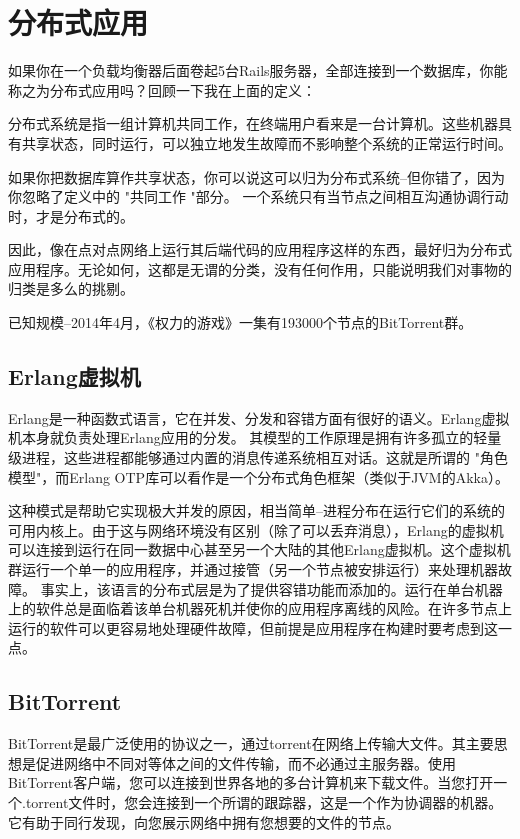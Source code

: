 \documentclass[degree=project,degree-type=project,cjk-font=noto]{thuthesis}
\begin{document}
\chapter{分布式应用}

如果你在一个负载均衡器后面卷起5台Rails服务器，全部连接到一个数据库，你能称之为分布式应用吗？回顾一下我在上面的定义：

分布式系统是指一组计算机共同工作，在终端用户看来是一台计算机。这些机器具有共享状态，同时运行，可以独立地发生故障而不影响整个系统的正常运行时间。

如果你把数据库算作共享状态，你可以说这可以归为分布式系统--但你错了，因为你忽略了定义中的 "共同工作 "部分。
一个系统只有当节点之间相互沟通协调行动时，才是分布式的。

因此，像在点对点网络上运行其后端代码的应用程序这样的东西，最好归为分布式应用程序。无论如何，这都是无谓的分类，没有任何作用，只能说明我们对事物的归类是多么的挑剔。

已知规模--2014年4月，《权力的游戏》一集有193000个节点的BitTorrent群。

\section{Erlang虚拟机}

Erlang是一种函数式语言，它在并发、分发和容错方面有很好的语义。Erlang虚拟机本身就负责处理Erlang应用的分发。
其模型的工作原理是拥有许多孤立的轻量级进程，这些进程都能够通过内置的消息传递系统相互对话。这就是所谓的 "角色模型"，而Erlang OTP库可以看作是一个分布式角色框架（类似于JVM的Akka）。

这种模式是帮助它实现极大并发的原因，相当简单--进程分布在运行它们的系统的可用内核上。由于这与网络环境没有区别（除了可以丢弃消息），Erlang的虚拟机可以连接到运行在同一数据中心甚至另一个大陆的其他Erlang虚拟机。这个虚拟机群运行一个单一的应用程序，并通过接管（另一个节点被安排运行）来处理机器故障。
事实上，该语言的分布式层是为了提供容错功能而添加的。运行在单台机器上的软件总是面临着该单台机器死机并使你的应用程序离线的风险。在许多节点上运行的软件可以更容易地处理硬件故障，但前提是应用程序在构建时要考虑到这一点。


\section{BitTorrent}

BitTorrent是最广泛使用的协议之一，通过torrent在网络上传输大文件。其主要思想是促进网络中不同对等体之间的文件传输，而不必通过主服务器。使用BitTorrent客户端，您可以连接到世界各地的多台计算机来下载文件。当您打开一个.torrent文件时，您会连接到一个所谓的跟踪器，这是一个作为协调器的机器。它有助于同行发现，向您展示网络中拥有您想要的文件的节点。
\end{document}
